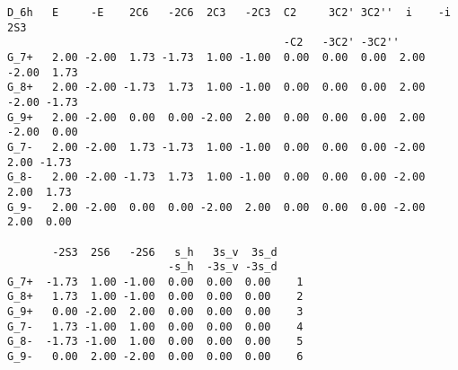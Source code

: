 \documentclass[12pt,a4paper,twoside]{report}
\begin{document}
\begin{tcolorbox}
\begin{scriptsize}
\begin{verbatim}
D_6h   E     -E    2C6   -2C6  2C3   -2C3  C2     3C2' 3C2''  i    -i    2S3  
                                           -C2   -3C2' -3C2''                  
G_7+   2.00 -2.00  1.73 -1.73  1.00 -1.00  0.00  0.00  0.00  2.00 -2.00  1.73
G_8+   2.00 -2.00 -1.73  1.73  1.00 -1.00  0.00  0.00  0.00  2.00 -2.00 -1.73
G_9+   2.00 -2.00  0.00  0.00 -2.00  2.00  0.00  0.00  0.00  2.00 -2.00  0.00
G_7-   2.00 -2.00  1.73 -1.73  1.00 -1.00  0.00  0.00  0.00 -2.00  2.00 -1.73
G_8-   2.00 -2.00 -1.73  1.73  1.00 -1.00  0.00  0.00  0.00 -2.00  2.00  1.73
G_9-   2.00 -2.00  0.00  0.00 -2.00  2.00  0.00  0.00  0.00 -2.00  2.00  0.00

       -2S3  2S6   -2S6   s_h   3s_v  3s_d
                         -s_h  -3s_v -3s_d
G_7+  -1.73  1.00 -1.00  0.00  0.00  0.00    1
G_8+   1.73  1.00 -1.00  0.00  0.00  0.00    2
G_9+   0.00 -2.00  2.00  0.00  0.00  0.00    3 
G_7-   1.73 -1.00  1.00  0.00  0.00  0.00    4
G_8-  -1.73 -1.00  1.00  0.00  0.00  0.00    5
G_9-   0.00  2.00 -2.00  0.00  0.00  0.00    6
\end{verbatim}
\end{scriptsize}
\end{tcolorbox}
\end{document}

